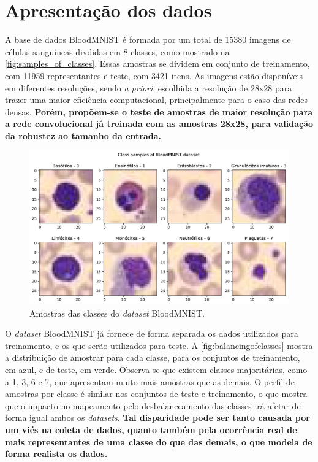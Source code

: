 \section{Apresentação dos dados}

A base de dados BloodMNIST é formada por um total de 15380 imagens de células sanguíneas divdidas em 8 classes, como mostrado na \autoref{fig:samples_of_classes}. Essas amostras se dividem em conjunto de treinamento, com 11959 representantes e teste, com 3421 itens. As imagens estão disponíveis em diferentes resoluções, sendo \textit{a priori}, escolhida a resolução de 28x28 para trazer uma maior eficiência computacional, principalmente para o caso das redes densas. \textbf{Porém, propõem-se o teste de amostras de maior resolução para a rede convolucional já treinada com as amostras 28x28, para validação da robustez ao tamanho da entrada.}

\begin{figure}[H]
	\centering
	\includegraphics[width=0.75\linewidth]{../../plot/samples_of_classes}
	\caption{Amostras das classes do \textit{dataset} BloodMNIST.}
	\label{fig:samples_of_classes}
\end{figure}

O \textit{dataset} BloodMNIST já fornece de forma separada os dados utilizados para treinamento, e os que serão utilizados para teste. A \autoref{fig:balancingofclasses} mostra a distribuição de amostrar para cada classe, para os conjuntos de treinamento, em azul, e de teste, em verde. Observa-se que existem classes majoritárias, como a 1, 3, 6 e 7, que apresentam muito mais amostras que as demais. O perfil de amostras por classe é similar nos conjuntos de teste e treinamento, o que mostra que o impacto no mapeamento pelo desbalanceamento das classes irá afetar de forma igual ambos os \textit{datasets}. \textbf{Tal disparidade pode ser tanto causada por um viés na coleta de dados, quanto também pela ocorrência real de mais representantes de uma classe do que das demais, o que modela de forma realista os dados.}

